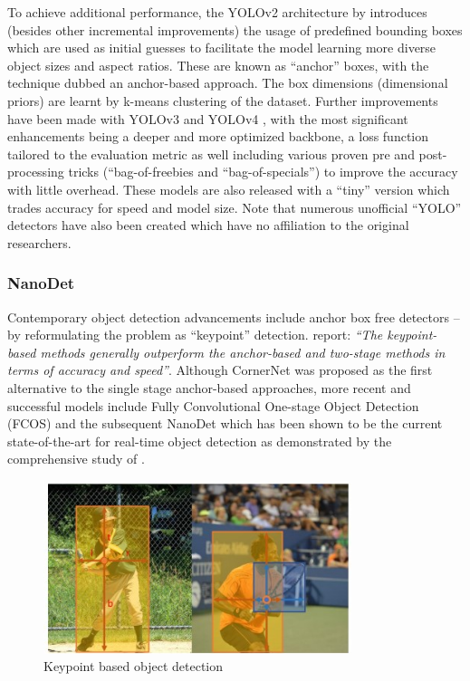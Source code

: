 \documentclass[a4paper,twoside,12pt]{report}
\begin{document}
To achieve additional performance, the YOLOv2 architecture by \cite{yolov2} introduces (besides other incremental improvements) the usage of predefined bounding boxes which are used as initial guesses to facilitate the model learning more diverse object sizes and aspect ratios. These are known as ``anchor'' boxes, with the technique dubbed an anchor-based approach. The box dimensions (dimensional priors) are learnt by k-means clustering of the dataset. Further improvements have been made with YOLOv3 \citep{yolov3} and YOLOv4 \citep{yolov4}, with the most significant enhancements being a deeper and more optimized backbone, a loss function tailored to the evaluation metric as well including various proven pre and post-processing tricks (``bag-of-freebies and ``bag-of-specials'') to improve the accuracy with little overhead. These models are also released with a ``tiny'' version which trades accuracy for speed and model size. Note that numerous unofficial ``YOLO'' detectors have also been created which have no affiliation to the original researchers.

\subsubsection{NanoDet}

Contemporary object detection advancements include anchor box free detectors -- by reformulating the problem as ``keypoint'' detection. \cite{comprehensive} report: \textit{``The keypoint-based methods generally outperform the anchor-based and two-stage methods in terms of accuracy and speed''}. Although CornerNet \citep{cornernet} was proposed as the first alternative to the single stage anchor-based approaches, more recent and successful models include Fully Convolutional One-stage Object Detection (FCOS) \citep{fcos} and the subsequent NanoDet \citep{nanodet} which has been shown to be the current state-of-the-art for real-time object detection as demonstrated by the comprehensive study of \cite{comprehensive}.

\begin{figure}[h!]
\begin{center}
\includegraphics[width=9cm]{images/keypointdetect.jpg}
\caption{Keypoint based object detection \citep{fcos}}
\label{fig:keypointdetect}
\end{center}
\end{figure}
\end{document}
